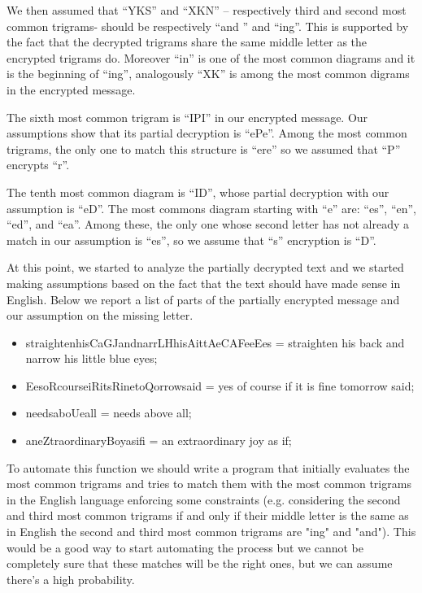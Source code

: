 \documentclass[12pt]{article}
\begin{document}
We then assumed that “YKS” and “XKN” – respectively third and second most common trigrams- should be respectively “and ” and “ing”. This is supported by the fact that the decrypted trigrams share the same middle letter as the encrypted trigrams do. Moreover “in” is one of the most common diagrams and it is the beginning of “ing”, analogously “XK” is among the most common digrams in the encrypted message.

The sixth most common trigram is “IPI” in our encrypted message. Our assumptions show that its partial decryption is “ePe”. Among the most common trigrams, the only one to match this structure is “ere” so we assumed that “P” encrypts “r”.  

The tenth most common diagram is “ID”, whose partial decryption with our assumption is “eD”. The most commons diagram starting with “e” are: “es”, “en”, “ed”, and “ea”. Among these, the only one whose second letter has not already a match in our assumption is “es”, so we assume that “s” encryption is “D”. 

At this point, we started to analyze the partially decrypted text and we started making assumptions based on the fact that the text should have made sense in English. Below we report a list of parts of the partially encrypted message and our assumption on the missing letter.

\begin{itemize}
    \item straightenhisCaGJandnarrLHhisAittAeCAFeeEes = straighten his back and narrow his little blue eyes;
    \item EesoRcourseiRitsRinetoQorrowsaid = yes of course if it is fine tomorrow said;
    \item needsaboUeall = needs above all;
    \item aneZtraordinaryBoyasifi = an extraordinary joy as if;
\end{itemize} 

To automate this function we should write a program that initially evaluates the most common trigrams and tries to match them with the most common trigrams in the English language enforcing some constraints (e.g. considering the second and third most common trigrams if and only if their middle letter is the same as in English the second and third most common trigrams are "ing" and "and"). This would be a good way to start automating the process but we cannot be completely sure that these matches will be the right ones, but we can assume there's a high probability.
\end{document}
